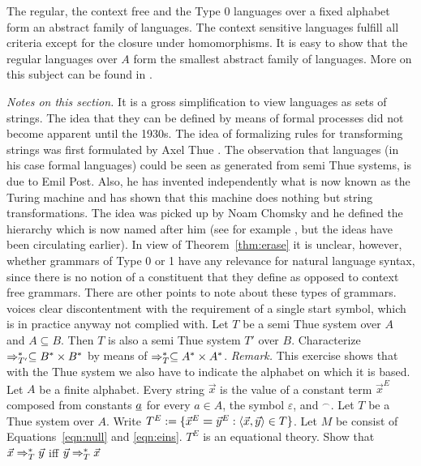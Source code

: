The regular, the context free and the Type 0 languages over a fixed
alphabet form an abstract family of languages. The context sensitive
languages fulfill all criteria except for the closure under
homomorphisms. It is easy to show that the regular languages over
$A$ form the smallest abstract family of languages. More on this
subject can be found in \cite{ginsburg:formal}.

{\it Notes on this section.} It is a gross simplification to view 
languages as sets of strings. The idea that they can be defined by 
means of formal processes did not become apparent until
the 1930s. The idea of formalizing rules for transforming strings
was first formulated by Axel Thue . 
The observation that languages (in his case formal languages) could be seen as
generated from semi Thue systems, is due to Emil Post. 
Also, he has
invented independently what is now known as the Turing machine and
has shown that this machine does nothing but string transformations.
The idea was picked up by Noam Chomsky 
and he defined the
hierarchy which is now named after him (see for example
\cite{chomsky:properties}, but the ideas have been circulating
earlier). In view of Theorem~\ref{thm:erase} it is unclear,
however, whether grammars of Type 0 or 1 have any relevance for
natural language syntax, since there is no notion of a constituent
that they define as opposed to context free grammars. There are 
other points to note about these types of grammars. 
\cite{langholm:indexed} voices clear discontentment with 
the requirement of a single start symbol, which is in practice 
anyway not complied with.
\vplatz
\exercise
Let $T$ be a semi Thue system over $A$ and $A \subseteq B$.
Then $T$ is also a semi Thue system $T'$ over $B$. Characterize
$\Rightarrow^{\ast}_{T'} \subseteq B^{\ast} \times B^{\ast}$ by means
of $\Rightarrow_T^{\ast} \subseteq A^{\ast}\times A^{\ast}$.
{\it Remark.} This exercise shows that with the Thue system
we also have to indicate the alphabet on which it is based.
\vplatz
\exercise
Let $A$ be a finite alphabet. Every string $\vec{x}$ is the value 
of a constant term $\vec{x}^E$ composed  from constants $\underline{a}$ 
for every $a \in A$, the symbol $\varepsilon$, and $^{\smallfrown}$. 
Let $T$ be a Thue system over $A$. Write $T^E := \{\vec{x}^E%
\boldsymbol{\doteq}\vec{y}^E : \auf \vec{x}, \vec{y}\zu \in T\}$. 
Let $M$ be consist of Equations~\eqref{eqn:null} and 
\eqref{eqn:eins}. $T^E$ is an equational theory. Show that 
$\vec{x} \Rightarrow^{\ast}_T \vec{y}$ iff $\vec{y} \Rightarrow^{\ast}_T \vec{x}$ 
